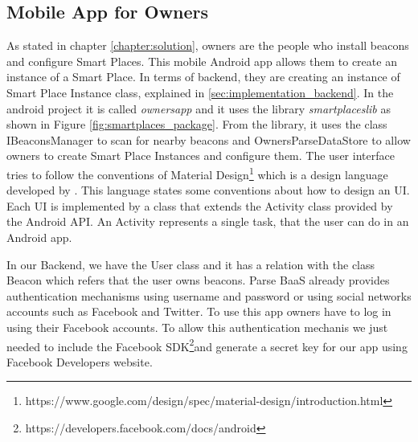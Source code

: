 \subsection{Mobile App for Owners}
\label{sub:implementation_mobile_app_for_owners}
As stated in chapter \ref{chapter:solution}, owners are the people who install beacons and configure Smart Places. This mobile Android app allows them to create an instance of a Smart Place.
In terms of backend, they are creating an instance of Smart Place Instance class, explained in \ref{sec:implementation_backend}.
In the android project it is called \emph{ownersapp} and it uses the library \emph{smartplaceslib} as shown in Figure \ref{fig:smartplaces_package}.
From the library, it uses the class IBeaconsManager to scan for nearby beacons and OwnersParseDataStore to allow owners to create Smart Place Instances and configure them.
The user interface tries to follow the conventions of Material Design\footnote{https://www.google.com/design/spec/material-design/introduction.html} which is a design language developed by .
This language states some conventions about how to design an \gls{UI}.
Each \gls{UI} is implemented by a class that extends the Activity class provided by the Android \gls{API}.
An Activity represents a single task, that the user can do in an Android app.

In our Backend, we have the User class and it has a relation with the class Beacon which refers that the user owns beacons.
Parse \gls{BaaS} already provides authentication mechanisms using username and password or using social networks accounts such as Facebook and Twitter.
To use this app owners have to log in using their Facebook accounts.
To allow this authentication mechanis we just needed to include the Facebook \gls{SDK}\footnote{https://developers.facebook.com/docs/android}and generate a secret key for our app using Facebook Developers website.

